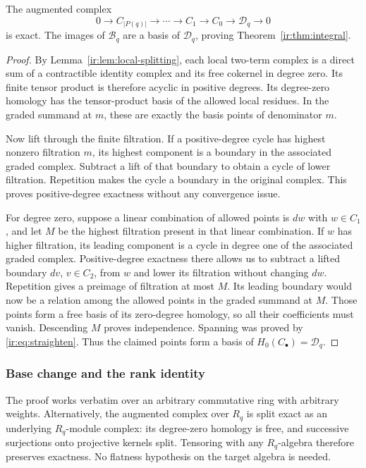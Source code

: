 \begin{theorem}\label{ir:thm:resolution}
The augmented complex
\[
 0\longrightarrow C_{|P(q)|}\longrightarrow\cdots
 \longrightarrow C_1\longrightarrow C_0\longrightarrow\mathcal D_q
 \longrightarrow0
\]
is exact. The images of $\mathcal B_q$ are a basis of $\mathcal D_q$, proving
Theorem~\ref{ir:thm:integral}.
\end{theorem}
\begin{proof}
By Lemma~\ref{ir:lem:local-splitting}, each local two-term complex is
a direct sum of a contractible identity complex and its free cokernel
in degree zero. Its finite tensor product is therefore acyclic in
positive degrees. Its degree-zero homology has the tensor-product
basis of the allowed local residues. In the graded summand at $m$,
these are exactly the basis points of denominator $m$.

Now lift through the finite filtration. If a positive-degree cycle
has highest nonzero filtration $m$, its highest component is a
boundary in the associated graded complex. Subtract a lift of that
boundary to obtain a cycle of lower filtration. Repetition makes the
cycle a boundary in the original complex. This proves positive-degree
exactness without any convergence issue.

For degree zero, suppose a linear combination of allowed points is
$d w$ with $w\in C_1$, and let $M$ be the highest filtration present
in that linear combination. If $w$ has higher filtration, its leading
component is a cycle in degree one of the associated graded complex.
Positive-degree exactness there allows us to subtract a lifted boundary
$d v$, $v\in C_2$, from $w$ and lower its filtration without changing
$d w$. Repetition gives a preimage of filtration at most $M$. Its
leading boundary would now be a relation among the allowed points in
the graded summand at $M$. Those points form a free basis of its
zero-degree homology, so all their coefficients must vanish. Descending
$M$ proves independence. Spanning was proved by
\eqref{ir:eq:straighten}. Thus the claimed points form a basis of
$H_0(C_\bullet)=\mathcal D_q$.
\end{proof}

\subsubsection{Base change and the rank identity}
The proof works verbatim over an arbitrary commutative ring with
arbitrary weights. Alternatively, the augmented complex over $R_q$
is split exact as an underlying $R_q$-module complex: its degree-zero
homology is free, and successive surjections onto projective kernels
split. Tensoring with any $R_q$-algebra therefore preserves exactness.
No flatness hypothesis on the target algebra is needed.

